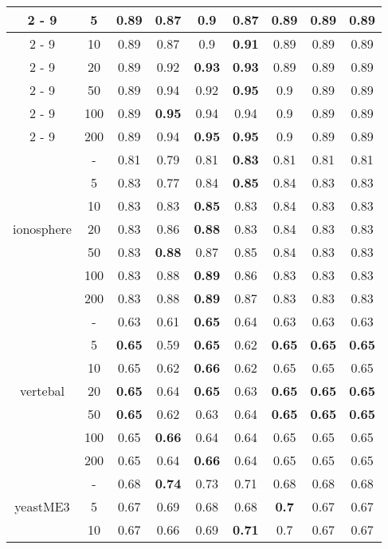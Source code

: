 \documentclass{article}%
\begin{document}
\begin{longtable}{c|c|ccccccc}
\cline{2%
-%
9}%
&5&0.89&0.87&\textbf{0.9}&0.87&0.89&0.89&0.89\\%
\cline{2%
-%
9}%
&10&0.89&0.87&0.9&\textbf{0.91}&0.89&0.89&0.89\\%
\cline{2%
-%
9}%
&20&0.89&0.92&\textbf{0.93}&\textbf{0.93}&0.89&0.89&0.89\\%
\cline{2%
-%
9}%
&50&0.89&0.94&0.92&\textbf{0.95}&0.9&0.89&0.89\\%
\cline{2%
-%
9}%
&100&0.89&\textbf{0.95}&0.94&0.94&0.9&0.89&0.89\\%
\cline{2%
-%
9}%
&200&0.89&0.94&\textbf{0.95}&\textbf{0.95}&0.9&0.89&0.89\\%
\hline%
\multirow{7}{*}{ionosphere}&{-}&0.81&0.79&0.81&\textbf{0.83}&0.81&0.81&0.81\\%
\cline{2%
-%
9}%
&5&0.83&0.77&0.84&\textbf{0.85}&0.84&0.83&0.83\\%
\cline{2%
-%
9}%
&10&0.83&0.83&\textbf{0.85}&0.83&0.84&0.83&0.83\\%
\cline{2%
-%
9}%
&20&0.83&0.86&\textbf{0.88}&0.83&0.84&0.83&0.83\\%
\cline{2%
-%
9}%
&50&0.83&\textbf{0.88}&0.87&0.85&0.84&0.83&0.83\\%
\cline{2%
-%
9}%
&100&0.83&0.88&\textbf{0.89}&0.86&0.83&0.83&0.83\\%
\cline{2%
-%
9}%
&200&0.83&0.88&\textbf{0.89}&0.87&0.83&0.83&0.83\\%
\hline%
\multirow{7}{*}{vertebal}&{-}&0.63&0.61&\textbf{0.65}&0.64&0.63&0.63&0.63\\%
\cline{2%
-%
9}%
&5&\textbf{0.65}&0.59&\textbf{0.65}&0.62&\textbf{0.65}&\textbf{0.65}&\textbf{0.65}\\%
\cline{2%
-%
9}%
&10&0.65&0.62&\textbf{0.66}&0.62&0.65&0.65&0.65\\%
\cline{2%
-%
9}%
&20&\textbf{0.65}&0.64&\textbf{0.65}&0.63&\textbf{0.65}&\textbf{0.65}&\textbf{0.65}\\%
\cline{2%
-%
9}%
&50&\textbf{0.65}&0.62&0.63&0.64&\textbf{0.65}&\textbf{0.65}&\textbf{0.65}\\%
\cline{2%
-%
9}%
&100&0.65&\textbf{0.66}&0.64&0.64&0.65&0.65&0.65\\%
\cline{2%
-%
9}%
&200&0.65&0.64&\textbf{0.66}&0.64&0.65&0.65&0.65\\%
\hline%
\multirow{7}{*}{yeastME3}&{-}&0.68&\textbf{0.74}&0.73&0.71&0.68&0.68&0.68\\%
\cline{2%
-%
9}%
&5&0.67&0.69&0.68&0.68&\textbf{0.7}&0.67&0.67\\%
\cline{2%
-%
9}%
&10&0.67&0.66&0.69&\textbf{0.71}&0.7&0.67&0.67\\%

\end{longtable}
\end{document}
